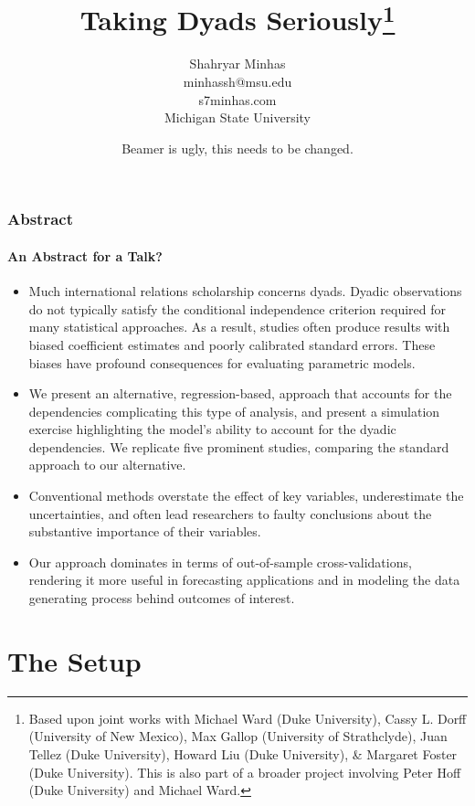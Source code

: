 \documentclass[10pt,xcolor=dvipsnames,compress]{beamer}
\title[AMEN]{Taking Dyads Seriously\thanks{Based upon joint works with Michael Ward (Duke University), Cassy L. Dorff (University of New Mexico), Max Gallop (University of Strathclyde), Juan Tellez (Duke University), Howard Liu (Duke University), \& Margaret Foster (Duke University). This is also part of a broader project involving Peter Hoff (Duke University) and Michael Ward.}
}
\author 
{Shahryar Minhas\\ minhassh@msu.edu \\ s7minhas.com \\
Michigan State University}
\date{Beamer is ugly, this needs to be changed.}
\begin{document}
\frame{\titlepage}


\begin{frame}
\frametitle{Abstract}
\framesubtitle{An Abstract for a Talk?}
\begin{itemize}
\item Much international relations scholarship concerns dyads. Dyadic observations do not typically satisfy the conditional independence criterion required for many statistical approaches. As a result, studies often produce results with biased coefficient estimates and poorly calibrated standard errors. These biases have profound consequences for evaluating parametric models. 

\item We present an alternative, regression-based, approach that accounts for the dependencies complicating this type of analysis, and present a simulation exercise highlighting the model's ability to account for the dyadic dependencies. We replicate five prominent studies, comparing the standard approach to our alternative. 

\item Conventional methods overstate the effect of key variables, underestimate the uncertainties, and often lead researchers to faulty conclusions about the substantive importance of their variables. 

\item Our approach dominates in terms of out-of-sample cross-validations, rendering it more useful in forecasting applications and in modeling the data generating process behind outcomes of interest.
\end{itemize}
\end{frame}

\section{The Setup}
\end{document}
